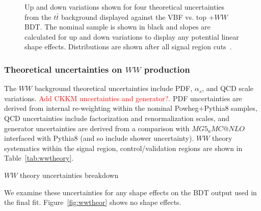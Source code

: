 \begin{figure}[!h]
{  }%
{\caption{Up and down variations shown for four theoretical uncertainties from the $t\bar{t}$ background displayed against the VBF vs. top +$WW$ BDT. The nominal sample is shown in black and slopes are calculated for up and down variations to display any potential linear shape effects. Distributions are shown after all signal region cuts~\cite{ourSupportNote}.
\label{fig:ttbartheory}}}
\end{figure}

\subsubsection{Theoretical uncertainties on $WW$ production}

The $WW$ background theoretical uncertainties include PDF, $\alpha_s$, and QCD scale variations. \textcolor{red}{Add CKKM uncertainties and generator?}. PDF uncertainties are derived from internal re-weighting within the nominal Powheg$+$Pythia8 samples, QCD uncertainties include factorization and renormalization scales, and generator uncertainties are derived from a comparison with $MG5_aMC@NLO$ interfaced with Pythia8 (and so include shower uncertainty). $WW$ theory systematics within the signal region, control/validation regions are shown in Table~\ref{tab:wwtheory}.

\begin{table}[h!]
\centering
\scalebox{1.0}{

}
\caption{$WW$ theory uncertainties breakdown}
\label{tab:wwtheory}
\end{table}

We examine these uncertainties for any shape effects on the BDT output used in the final fit. Figure~\ref{fig:wwtheor} shows no shape effects.

